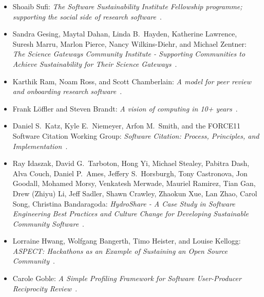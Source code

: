 \documentclass[11pt, oneside]{amsart}
\begin{document}
\begin{itemize}%
    \item Shoaib Sufi: \emph{The Software Sustainability Institute Fellowship
    programme; supporting the social side of research software}~\cite{Sufi:2016ws}.

    \item Sandra Gesing\textsuperscript{\textasteriskcentered}, Maytal Dahan, Linda B.~Hayden, Katherine Lawrence,
    Suresh Marru, Marlon Pierce, Nancy Wilkins-Diehr, and Michael Zentner:
    \emph{The Science Gateways Community Institute - Supporting Communities to
    Achieve Sustainability for Their Science Gateways}~\cite{Gesing:2016ws}.

    \item Karthik Ram\textsuperscript{\textasteriskcentered}, Noam Ross,
    and Scott Chamberlain: \emph{A model for
    peer review and onboarding research software}~\cite{Ram:2016ws}.

    \item Frank L\"{o}ffler and Steven Brandt\textsuperscript{\textasteriskcentered}:
    \emph{A vision of computing in 10+ years}~\cite{Loffler:2016ws}.

    \item Daniel S.~Katz, Kyle E.~Niemeyer\textsuperscript{\textasteriskcentered},
    Arfon M.~Smith, and the FORCE11 Software Citation Working Group:
    \emph{Software Citation: Process, Principles, and Implementation}~\cite{Katz:2016ws}.

    \item Ray Idaszak\textsuperscript{\textasteriskcentered},
    David G.~Tarboton, Hong Yi, Michael Stealey,
    Pabitra Dash, Alva Couch, Daniel P.~Ames, Jeffery S.~Horsburgh, Tony Castronova,
    Jon Goodall, Mohamed Morsy, Venkatesh Merwade, Mauriel Ramirez, Tian Gan,
    Drew (Zhiyu) Li, Jeff Sadler, Shawn Crawley, Zhaokun Xue, Lan Zhao, Carol Song,
    Christina Bandaragoda: \emph{HydroShare - A Case Study in Software Engineering
    Best Practices and Culture Change for Developing Sustainable Community
    Software}~\cite{Idaszak:2016ws}.

    \item Lorraine Hwang\textsuperscript{\textasteriskcentered},
    Wolfgang Bangerth, Timo Heister, and Louise Kellogg:
    \emph{ASPECT: Hackathons as an Example of Sustaining an Open Source
    Community}~\cite{Hwang:2016ws}.

    \item Carole Goble: \emph{A Simple Profiling Framework for Software
    User-Producer Reciprocity Review}~\cite{Goble:2016ws}.


\end{itemize}
\end{document}
